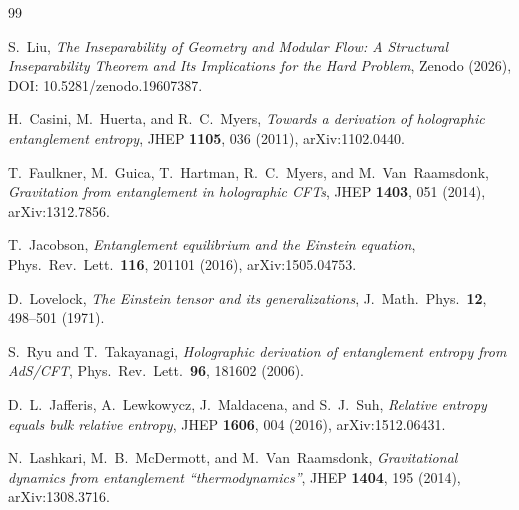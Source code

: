 \documentclass[12pt]{article}
\theoremstyle{definition}
\theoremstyle{remark}
\begin{document}
\newpage
{}

\begin{thebibliography}{99}

S.~Liu, \emph{The Inseparability of Geometry and Modular Flow: A Structural Inseparability Theorem and Its Implications for the Hard Problem}, Zenodo (2026), DOI: 10.5281/zenodo.19607387.

H.~Casini, M.~Huerta, and R.~C.~Myers,
\emph{Towards a derivation of holographic entanglement entropy},
JHEP \textbf{1105}, 036 (2011),
arXiv:1102.0440.

T.~Faulkner, M.~Guica, T.~Hartman, R.~C.~Myers, and M.~Van~Raamsdonk,
\emph{Gravitation from entanglement in holographic CFTs},
JHEP \textbf{1403}, 051 (2014),
arXiv:1312.7856.

T.~Jacobson,
\emph{Entanglement equilibrium and the Einstein equation},
Phys.\ Rev.\ Lett.\ \textbf{116}, 201101 (2016),
arXiv:1505.04753.

D.~Lovelock,
\emph{The Einstein tensor and its generalizations},
J.\ Math.\ Phys.\ \textbf{12}, 498--501 (1971).

S.~Ryu and T.~Takayanagi,
\emph{Holographic derivation of entanglement entropy from AdS/CFT},
Phys.\ Rev.\ Lett.\ \textbf{96}, 181602 (2006).

D.~L.~Jafferis, A.~Lewkowycz, J.~Maldacena, and S.~J.~Suh,
\emph{Relative entropy equals bulk relative entropy},
JHEP \textbf{1606}, 004 (2016),
arXiv:1512.06431.

N.~Lashkari, M.~B.~McDermott, and M.~Van~Raamsdonk,
\emph{Gravitational dynamics from entanglement ``thermodynamics''},
JHEP \textbf{1404}, 195 (2014),
arXiv:1308.3716.

\end{thebibliography}
 
\end{document}

